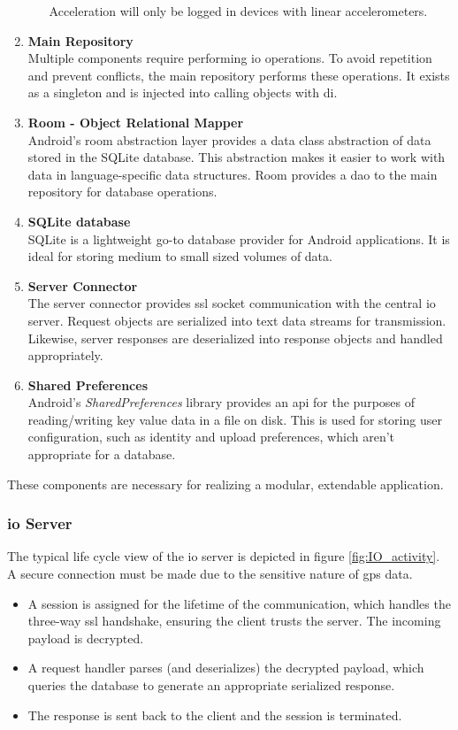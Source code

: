 \begin{enumerate}
\begin{enumerate}
Acceleration will only be logged in devices with linear accelerometers.
\end{enumerate}
\item \textbf{Main Repository}\\
Multiple components require performing \ac{io} operations.
To avoid repetition and prevent conflicts, the main repository performs these operations.
It exists as a singleton and is injected into calling objects with \ac{di}.
\item \textbf{Room - Object Relational Mapper}\\
Android's room abstraction layer provides a data class abstraction of data stored in the SQLite database.
This abstraction makes it easier to work with data in language-specific data structures.
Room provides a \ac{dao} to the main repository for database operations.
\item \textbf{SQLite database}\\
SQLite is a lightweight go-to database provider for Android applications.
It is ideal for storing medium to small sized volumes of data.
\item \textbf{Server Connector}\\
The server connector provides \ac{ssl} socket communication with the central \ac{io} server.
Request objects are serialized into text data streams for transmission.
Likewise, server responses are deserialized into response objects and handled appropriately.
\item \textbf{Shared Preferences}\\
Android's \textit{SharedPreferences} library provides an \ac{api} for the purposes of reading/writing key value data in a file on disk.
This is used for storing user configuration, such as identity and upload preferences, which aren't appropriate for a database.
\end{enumerate}

These components are necessary for realizing a modular, extendable application.

\pagebreak
\subsubsection{\Ac{io} Server}
The typical life cycle view of the \ac{io} server is depicted in figure \ref{fig:IO_activity}.
A secure connection must be made due to the sensitive nature of \ac{gps} data.
\begin{itemize}
\item A session is assigned for the lifetime of the communication, which handles the three-way \ac{ssl} handshake, ensuring the client trusts the server. The incoming payload is decrypted.
\item A request handler parses (and deserializes) the decrypted payload, which queries the database to generate an appropriate serialized response.
\item The response is sent back to the client and the session is terminated.
\end{itemize}

